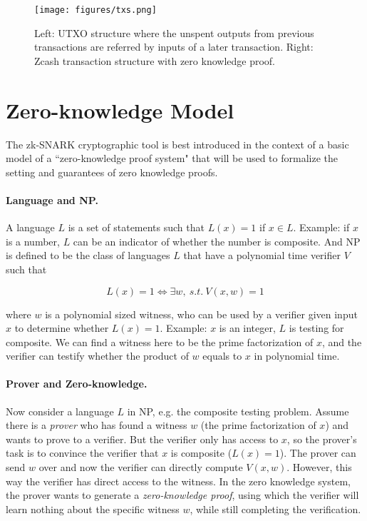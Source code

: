 \documentclass[a4paper]{article}
\newcommand{\pramod}[1]{{\color{red}
\footnotesize[Pramod: #1] }}
\begin{document}




\begin{figure}
    \centering
    \texttt{[image: figures/txs.png]}
    \caption{Left: UTXO structure where the unspent outputs from previous transactions are referred by inputs of a later transaction. Right: Zcash transaction structure with zero knowledge proof.}
    \label{fig:utxo}
\end{figure}



\section*{Zero-knowledge Model}
The zk-SNARK cryptographic tool is best  introduced in the context of  a basic model of a ``zero-knowledge proof system" that will be used to formalize the setting and guarantees of zero knowledge proofs. 

\paragraph{Language and NP.}
A language $L$ is a set of statements such that $L(x) = 1$  if $x\in L$. Example: if $x$ is a number, $L$ can be an indicator of whether the number is composite. 
And NP is defined to be the class of languages $L$ that have a polynomial time verifier $V$ such that 

$$L(x)=1 \iff \exists w,\ s.t.\ V(x,w)=1$$

where $w$ is a polynomial sized witness, who can be used by a verifier given input $x$ to determine whether $L(x) = 1$. Example: $x$ is an integer, $L$ is testing for composite. We can find a witness here to be the prime factorization of $x$, and the verifier can testify whether the product of $w$ equals to $x$ in polynomial time.

\paragraph{Prover and Zero-knowledge.}
Now consider a language $L$ in NP, e.g. the composite testing problem. Assume there is a {\em prover} who has found a witness $w$ (the prime factorization of $x$) and wants to prove to a verifier. But the verifier only has access to $x$, so the prover's task is to convince the verifier that $x$ is composite ($L(x) = 1$). The prover can  send $w$  over and now the verifier can directly compute $V(x, w)$.  However, this way the verifier has direct access to  the witness. In the zero knowledge system, the prover wants to generate a {\em zero-knowledge proof}, using which the verifier will  learn nothing  about the specific witness $w$, while still completing the verification. 
\end{document}

